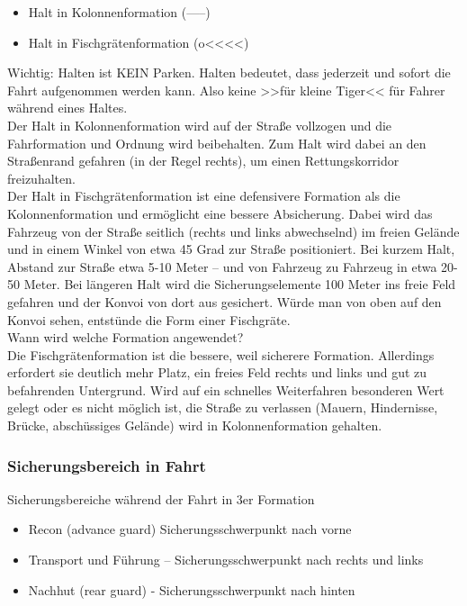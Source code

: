 	\begin{itemize}
		\item Halt in Kolonnenformation (-----)
		\item Halt in Fischgrätenformation (o<<<<)
	\end{itemize}

	Wichtig: Halten ist KEIN Parken. Halten bedeutet, dass jederzeit und sofort die Fahrt aufgenommen werden kann. Also keine >>für kleine Tiger<< für Fahrer während eines Haltes. \\
	Der Halt in Kolonnenformation wird auf der Straße vollzogen und die Fahrformation und Ordnung wird beibehalten. Zum Halt wird dabei an den Straßenrand gefahren (in der Regel rechts), um einen Rettungskorridor freizuhalten. \\
	Der Halt in Fischgrätenformation ist eine defensivere Formation als die Kolonnenformation und ermöglicht eine bessere Absicherung. Dabei wird das Fahrzeug von der Straße seitlich (rechts und links abwechselnd) im freien Gelände und in einem Winkel von etwa 45 Grad  zur Straße positioniert. Bei kurzem Halt, Abstand zur Straße etwa 5-10 Meter – und von Fahrzeug zu Fahrzeug in etwa 20-50 Meter. Bei längeren Halt wird die Sicherungselemente 100 Meter ins freie Feld gefahren und der Konvoi von dort aus gesichert. Würde man von oben auf den Konvoi sehen, entstünde die Form einer Fischgräte. \\
	Wann wird welche Formation angewendet? \\
	Die Fischgrätenformation ist die bessere, weil sicherere Formation. Allerdings erfordert sie deutlich mehr Platz, ein freies Feld rechts und links und gut zu befahrenden Untergrund. Wird auf ein schnelles Weiterfahren besonderen Wert gelegt oder es nicht möglich ist, die Straße zu verlassen (Mauern, Hindernisse, Brücke, abschüssiges Gelände) wird in Kolonnenformation gehalten. \\
\subsubsection{Sicherungsbereich in Fahrt}
Sicherungsbereiche während der Fahrt in 3er Formation

	\begin{itemize}
		\item Recon (advance guard) Sicherungsschwerpunkt nach vorne
		\item Transport und Führung – Sicherungsschwerpunkt nach rechts und links
		\item Nachhut (rear guard) - Sicherungsschwerpunkt nach hinten
	\end{itemize}

